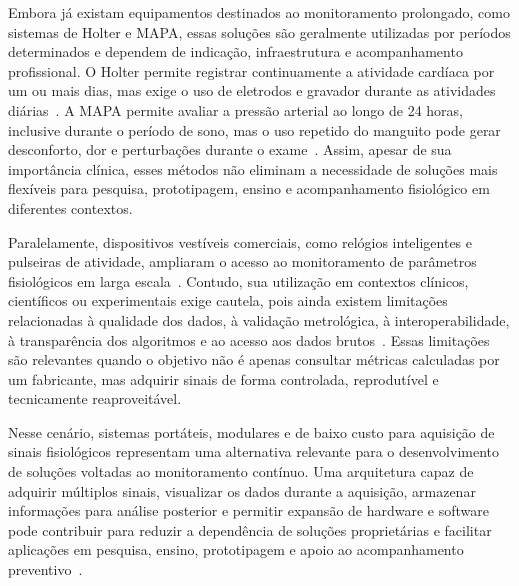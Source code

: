 \documentclass[a4paper,12pt]{fcte}
\begin{document}
Embora já existam equipamentos destinados ao monitoramento prolongado, como sistemas de Holter e MAPA, essas soluções são geralmente utilizadas por períodos determinados e dependem de indicação, infraestrutura e acompanhamento profissional. O Holter permite registrar continuamente a atividade cardíaca por um ou mais dias, mas exige o uso de eletrodos e gravador durante as atividades diárias~\cite{mayo2024holter}. A MAPA permite avaliar a pressão arterial ao longo de 24 horas, inclusive durante o período de sono, mas o uso repetido do manguito pode gerar desconforto, dor e perturbações durante o exame~\cite{lee2024abpm,thomsen2024abpm_frequency}. Assim, apesar de sua importância clínica, esses métodos não eliminam a necessidade de soluções mais flexíveis para pesquisa, prototipagem, ensino e acompanhamento fisiológico em diferentes contextos.

Paralelamente, dispositivos vestíveis comerciais, como relógios inteligentes e pulseiras de atividade, ampliaram o acesso ao monitoramento de parâmetros fisiológicos em larga escala~\cite{jamieson2025consumer_wearables,huhn2022wearables_health_research}. Contudo, sua utilização em contextos clínicos, científicos ou experimentais exige cautela, pois ainda existem limitações relacionadas à qualidade dos dados, à validação metrológica, à interoperabilidade, à transparência dos algoritmos e ao acesso aos dados brutos~\cite{canali2022wearables_challenges,jamieson2025consumer_wearables}. Essas limitações são relevantes quando o objetivo não é apenas consultar métricas calculadas por um fabricante, mas adquirir sinais de forma controlada, reprodutível e tecnicamente reaproveitável.

Nesse cenário, sistemas portáteis, modulares e de baixo custo para aquisição de sinais fisiológicos representam uma alternativa relevante para o desenvolvimento de soluções voltadas ao monitoramento contínuo. Uma arquitetura capaz de adquirir múltiplos sinais, visualizar os dados durante a aquisição, armazenar informações para análise posterior e permitir expansão de hardware e software pode contribuir para reduzir a dependência de soluções proprietárias e facilitar aplicações em pesquisa, ensino, prototipagem e apoio ao acompanhamento preventivo~\cite{ates2022wearable_sensors,vaghasiya2023wearable_telehealth}.
\end{document}
